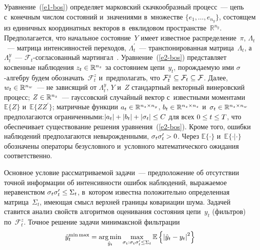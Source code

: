 \begin{multicols}{2}
     Уравнение~(\ref{e1-bos}) определяет марковский скачкообразный процесс~--- 
цепь с~конечным чис\-лом со\-сто\-яний и~значениями в~множестве $\{ e_1, \ldots , 
e_{n_y}\}$, со\-сто\-ящем из единичных координатных векторов в~евклидовом 
пространстве~$\mathbb{R}^{n_y}$. Предполагается, что начальное 
со\-сто\-яние~$Y$ имеет известное распределение~$\pi$, $\Lambda_t$~--- 
мат\-ри\-ца интенсивностей переходов, $\Lambda_t^\prime$~--- 
транспонированная мат\-ри\-ца~$\Lambda_t$, а $\Lambda_t^y$~---  
$\mathcal{F}_t$-со\-гла\-со\-ван\-ный мартингал~\cite{13-bos}. Уравнение~(\ref{e2-bos}) 
пред\-став\-ля\-ет косвенные наблюдения $z_t\hm\in \mathbb{R}^{n_z}$ за 
со\-сто\-яни\-ем цепи~$y_t$, по\-рож\-да\-емую ими $\sigma$-ал\-геб\-ру будем 
обозначать~$\mathcal{F}_t^z$ и~предполагать, что 
$\mathcal{F}_t^z\hm\subseteq \mathcal{F}_t\hm\subseteq \mathcal{F}$. Далее, 
$w_t\hm\in \mathbb{R}^{n_w}$~--- не зависящий от $\Lambda_t^y$, $Y$ и~$Z$ 
стандартный векторный винеровский процесс; $Z\hm\in 
     \mathbb{R}^{n_z}$~--- гауссовский случайный вектор с~известными 
моментами $\mathbb{E}\{Z\}$ и~$\mathbb{E}\{Z Z^\prime\}$; мат\-рич\-ные 
функции $a_t\hm\in \mathbb{R}^{n_z\times n_y}$, $b_t\hm\in 
\mathbb{R}^{n_z\times n_z}$ и~$\sigma_t\hm\in \mathbb{R}^{n_z\times n_w}$ 
предполагаются ограниченными:$\vert a_t\vert \hm+ \vert b_t\vert\hm+ \vert 
\sigma_t\vert \hm\leq C$ для всех $0\hm\leq t\hm\leq T$, что обеспечивает 
существование решения уравнения~(\ref{e2-bos}). Кроме того, ошибки наблюдений 
предполагаются не\-вы\-рож\-ден\-ны\-ми, $\sigma_t \sigma_t^\prime \hm>0$. Через 
$\mathbb{E}\{\cdot \}$ и~$\mathbb{E}\{\cdot\vert\cdot\}$ обозначены 
операторы безуслов\-но\-го и~услов\-но\-го математического ожидания 
соответственно.
     
     Основное условие рассматриваемой задачи~--- предположение об 
отсутствии точ\-ной информации об ин\-тен\-сив\-ности ошибок наблюдений, 
вы\-ра\-жа\-емое неравенством $\sigma_t \sigma_t^\prime \hm\leq \Sigma_t$, 
в~котором известна положительно определенная мат\-ри\-ца~$\Sigma_t$, име\-ющая 
\mbox{смысл} верх\-ней границы ковариации шума. Задачей ставится анализ свойств 
алгоритмов оценивания состояния цепи~$y_t$ (фильт\-ров) 
по~$\mathcal{F}_t^z$. Точ\-ное решение задачи минимаксной фильт\-рации
     $$
     \hat{y}_t^{\min\max} =\mathop{\mathrm{arg}\,\mathrm{min}}\limits_{\hat{y}_t} \max\limits_{\sigma_t: 
\sigma_t \sigma_t^\prime \leq \Sigma_t} \mathbb{E} \left\{ \left\vert \hat{y}_t -
y_t\right\vert^2\right\}
     $$
     
\vspace*{-2pt}


\end{multicols}
